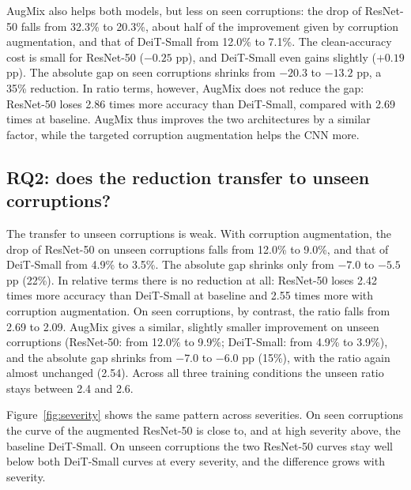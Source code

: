 \documentclass[a4paper,11pt]{article}
\begin{document}
AugMix also helps both models, but less on seen corruptions: the drop of ResNet-50 falls from 32.3\% to 20.3\%, about half of the improvement given by corruption augmentation, and that of DeiT-Small from 12.0\% to 7.1\%. The clean-accuracy cost is small for ResNet-50 ($-0.25$ pp), and DeiT-Small even gains slightly ($+0.19$ pp). The absolute gap on seen corruptions shrinks from $-20.3$ to $-13.2$ pp, a 35\% reduction. In ratio terms, however, AugMix does not reduce the gap: ResNet-50 loses 2.86 times more accuracy than DeiT-Small, compared with 2.69 times at baseline. AugMix thus improves the two architectures by a similar factor, while the targeted corruption augmentation helps the CNN more.

\begin{table}[t]
\centering
\caption{CNN--ViT robustness gap $\Delta_G = D_G^\text{ViT}-D_G^\text{CNN}$ in percentage points ($\pm$ standard error of the difference) and ratio $R_G = D_G^\text{CNN}/D_G^\text{ViT}$. All gaps are significant at $p<0.001$ (Welch's $t$-test).}
\label{tab:gap}
\small

\end{table}

\subsection{RQ2: does the reduction transfer to unseen corruptions?}
The transfer to unseen corruptions is weak. With corruption augmentation, the drop of ResNet-50 on unseen corruptions falls from 12.0\% to 9.0\%, and that of DeiT-Small from 4.9\% to 3.5\%. The absolute gap shrinks only from $-7.0$ to $-5.5$ pp (22\%). In relative terms there is no reduction at all: ResNet-50 loses 2.42 times more accuracy than DeiT-Small at baseline and 2.55 times more with corruption augmentation. On seen corruptions, by contrast, the ratio falls from 2.69 to 2.09. AugMix gives a similar, slightly smaller improvement on unseen corruptions (ResNet-50: from 12.0\% to 9.9\%; DeiT-Small: from 4.9\% to 3.9\%), and the absolute gap shrinks from $-7.0$ to $-6.0$ pp (15\%), with the ratio again almost unchanged (2.54). Across all three training conditions the unseen ratio stays between 2.4 and 2.6.

Figure~\ref{fig:severity} shows the same pattern across severities. On seen corruptions the curve of the augmented ResNet-50 is close to, and at high severity above, the baseline DeiT-Small. On unseen corruptions the two ResNet-50 curves stay well below both DeiT-Small curves at every severity, and the difference grows with severity.
\end{document}

